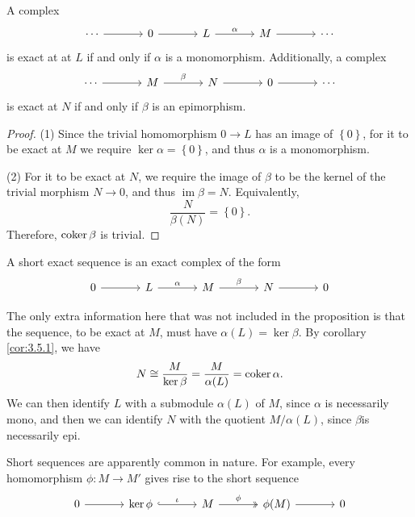 \begin{proposition}\label{prp:3.7.1}
	A complex
	\[\begin{tikzcd}[row sep=2.5em, column sep=3.5em]
		\cdots\arrow[r]&0\arrow[r]&L\arrow[r, "\alpha "]&M\arrow[r]&\cdots
	\end{tikzcd}\]
	is exact at at $L$ if and only if $\alpha $ is a monomorphism. Additionally, a complex
	\[\begin{tikzcd}[row sep=2.5em, column sep=3.5em]
		\cdots\arrow[r]&M\arrow[r,  "\beta "]&N\arrow[r]&0\arrow[r]&\cdots
	\end{tikzcd}\]
	is exact at $N$ if and only if $\beta $ is an epimorphism.
\end{proposition}
\begin{proof}
	(1) Since the trivial homomorphism $0\to L$ has an image of  $\left\{ 0 \right\} $, for it to be exact at $M$ we require $\ker \alpha =\left\{ 0 \right\} $, and thus $\alpha $ is a monomorphism.

	(2) For it to be exact at $N$, we require the image of $\beta $ to be the kernel of the trivial morphism $N\to 0$, and thus $\operatorname{im} \beta =N$. Equivalently,
	\[
		\frac{N}{\beta (N)}=\left\{ 0 \right\} 
	.\]
	Therefore, $\operatorname{coker} \beta $ is trivial.
\end{proof}
\begin{definition}\label{dfn:3.7.2}
	A short exact sequence is an exact complex of the form
	\[\begin{tikzcd}[row sep=2.5em, column sep=3.5em]
		0\arrow[r]&L\arrow[r, "\alpha "]&M\arrow[r, "\beta "]&N\arrow[r]&0
	\end{tikzcd}\]
\end{definition}

The only extra information here that was not included in the proposition is that the sequence, to be exact at $M$, must have $\alpha (L)=\ker \beta $. By corollary \ref{cor:3.5.1}, we have
\[
	N\cong \frac{M}{\ker \beta }=\frac{M}{\alpha (L)}=\operatorname{coker} \alpha 
.\]
We can then identify $L$ with a submodule $\alpha (L)$ of $M$, since $\alpha $ is necessarily mono, and then we can identify $N$ with the quotient $M /\alpha (L)$, since $\beta $is necessarily epi.

Short sequences are apparently common in nature. For example, every homomorphism $\phi : M \to M'$ gives rise to the short sequence
\[\begin{tikzcd}[row sep=2.5em, column sep=3.5em]
	0\arrow[r]&\ker \phi \arrow[r, hook, "\iota "]&M\arrow[r, two heads, "\phi "]&\phi (M)\arrow[r]&0
\end{tikzcd}\]

